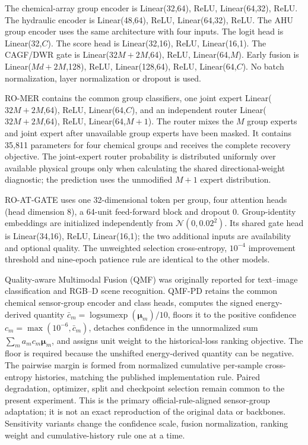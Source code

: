 \documentclass[10pt]{article}
\begin{document}
The chemical-array group encoder is Linear(32,64), ReLU, Linear(64,32), ReLU. The hydraulic encoder is Linear(48,64), ReLU, Linear(64,32), ReLU. The AHU group encoder uses the same architecture with four inputs. The logit head is Linear(32,$C$). The score head is Linear(32,16), ReLU, Linear(16,1). The CAGF/DWR gate is Linear($32M+2M$,64), ReLU, Linear(64,$M$). Early fusion is Linear($Md+2M$,128), ReLU, Linear(128,64), ReLU, Linear(64,$C$). No batch normalization, layer normalization or dropout is used.

RO-MER contains the common group classifiers, one joint expert Linear($32M+2M$,64), ReLU, Linear(64,$C$), and an independent router Linear($32M+2M$,64), ReLU, Linear(64,$M+1$). The router mixes the $M$ group experts and joint expert after unavailable group experts have been masked. It contains 35,811 parameters for four chemical groups and receives the complete recovery objective. The joint-expert router probability is distributed uniformly over available physical groups only when calculating the shared directional-weight diagnostic; the prediction uses the unmodified $M+1$ expert distribution.

RO-AT-GATE uses one 32-dimensional token per group, four attention heads (head dimension 8), a 64-unit feed-forward block and dropout 0. Group-identity embeddings are initialized independently from $\mathcal N(0,0.02^2)$. Its shared gate head is Linear(34,16), ReLU, Linear(16,1); the two additional inputs are availability and optional quality. The unweighted selection cross-entropy, $10^{-4}$ improvement threshold and nine-epoch patience rule are identical to the other models.

Quality-aware Multimodal Fusion (QMF) was originally reported for text--image classification and RGB--D scene recognition. QMF-PD retains the common chemical sensor-group encoder and class heads, computes the signed energy-derived quantity $\bar c_m=\operatorname{logsumexp}(\boldsymbol\mu_m)/10$, floors it to the positive confidence $c_m=\max(10^{-6},\bar c_m)$, detaches confidence in the unnormalized sum $\sum_m a_mc_m\boldsymbol\mu_m$, and assigns unit weight to the historical-loss ranking objective. The floor is required because the unshifted energy-derived quantity can be negative. The pairwise margin is formed from normalized cumulative per-sample cross-entropy histories, matching the published implementation rule. Paired degradation, optimizer, split and checkpoint selection remain common to the present experiment. This is the primary official-rule-aligned sensor-group adaptation; it is not an exact reproduction of the original data or backbones. Sensitivity variants change the confidence scale, fusion normalization, ranking weight and cumulative-history rule one at a time.
\end{document}
